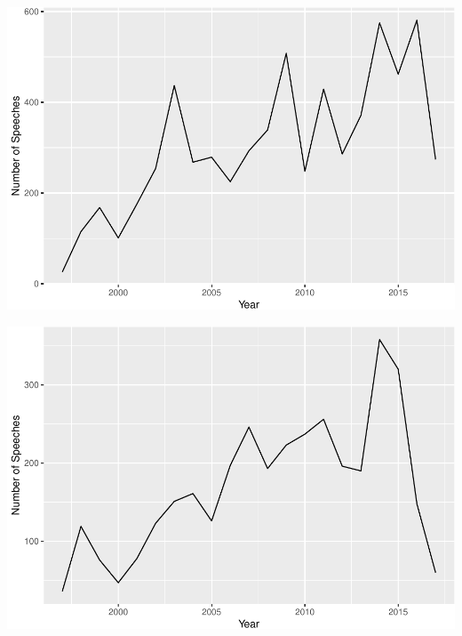 \documentclass[]{article}
\let\origfigure\figure
\let\endorigfigure\endfigure
\renewenvironment{figure}[1][2] {
    \expandafter\origfigure\expandafter[H]
} {
    \endorigfigure
}
\theoremstyle{definition}
\theoremstyle{definition}
\theoremstyle{definition}
\theoremstyle{remark}
\begin{document}
\begin{figure}
\centering
\includegraphics{methodology_files/figure-latex/middle-east-plot-1.pdf}
\caption{\label{fig:middle-east-plot}Number of Speeches in ``Middle East''
Topic per Year}
\end{figure}

\begin{figure}
\centering
\includegraphics{methodology_files/figure-latex/wales-scotland-plot-1.pdf}
\caption{\label{fig:wales-scotland-plot}Number of Speeches in ``Wales \&
Scotland'' Topic per Year}
\end{figure}
\end{document}
